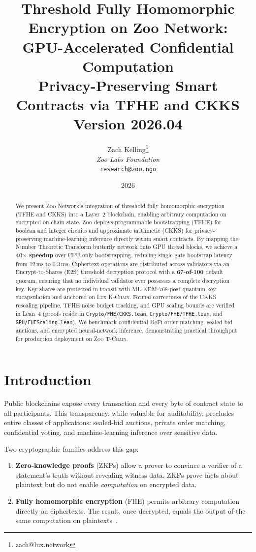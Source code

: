 \documentclass[11pt,letterpaper]{article}
\title{\textbf{Threshold Fully Homomorphic Encryption on Zoo Network:\\GPU-Accelerated Confidential Computation}\\
\large Privacy-Preserving Smart Contracts via TFHE and CKKS\\
\vspace{5pt}
\normalsize Version 2026.04}
\author{
Zach Kelling\thanks{zach@lux.network}\\
\textit{Zoo Labs Foundation}\\
\texttt{research@zoo.ngo}
}
\date{2026}
\theoremstyle{definition}
\theoremstyle{remark}
\newcommand{\Zoo}{\textsc{Zoo}}
\newcommand{\Lux}{\textsc{Lux}}
\newcommand{\TChain}{\textsc{T-Chain}}
\newcommand{\KChain}{\textsc{K-Chain}}
\newcommand{\TFHE}{\textsc{TFHE}}
\newcommand{\CKKS}{\textsc{CKKS}}
\newcommand{\MLKEM}{\textsc{ML-KEM}}
\begin{document}
\zoocoverpage

\begin{abstract}
We present \Zoo{} Network's integration of threshold fully homomorphic encryption (\TFHE{} and \CKKS{}) into a Layer~2 blockchain, enabling arbitrary computation on encrypted on-chain state. \Zoo{} deploys programmable bootstrapping (\TFHE{}) for boolean and integer circuits and approximate arithmetic (\CKKS{}) for privacy-preserving machine-learning inference directly within smart contracts. By mapping the Number Theoretic Transform butterfly network onto GPU thread blocks, we achieve a \textbf{40$\times$ speedup} over CPU-only bootstrapping, reducing single-gate bootstrap latency from 12\,ms to 0.3\,ms. Ciphertext operations are distributed across validators via an Encrypt-to-Shares (E2S) threshold decryption protocol with a \textbf{67-of-100} default quorum, ensuring that no individual validator ever possesses a complete decryption key. Key shares are protected in transit with \MLKEM{}-768 post-quantum key encapsulation and anchored on \Lux{} \KChain{}. Formal correctness of the \CKKS{} rescaling pipeline, \TFHE{} noise budget tracking, and GPU scaling bounds are verified in Lean~4 (proofs reside in \texttt{Crypto/FHE/CKKS.lean}, \texttt{Crypto/FHE/TFHE.lean}, and \texttt{GPU/FHEScaling.lean}). We benchmark confidential DeFi order matching, sealed-bid auctions, and encrypted neural-network inference, demonstrating practical throughput for production deployment on \Zoo{} \TChain{}.
\end{abstract}

\tableofcontents
\newpage

\section{Introduction}
\label{sec:intro}

Public blockchains expose every transaction and every byte of contract state to all participants. This transparency, while valuable for auditability, precludes entire classes of applications: sealed-bid auctions, private order matching, confidential voting, and machine-learning inference over sensitive data.

Two cryptographic families address this gap:

\begin{enumerate}
  \item \textbf{Zero-knowledge proofs} (ZKPs) allow a prover to convince a verifier of a statement's truth without revealing witness data. ZKPs prove facts about plaintext but do not enable \emph{computation} on encrypted data.
  \item \textbf{Fully homomorphic encryption} (FHE) permits arbitrary computation directly on ciphertexts. The result, once decrypted, equals the output of the same computation on plaintexts~\cite{gentry2009fhe}.
\end{enumerate}
\end{document}
